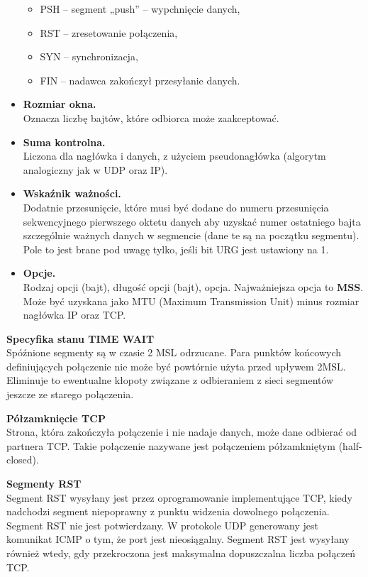 \documentclass[../main.tex]{subfiles}
\begin{document}
\begin{itemize}
\begin{itemize}
            \item PSH – segment „push” – wypchnięcie danych,
            \item RST – zresetowanie połączenia,
            \item SYN – synchronizacja,
            \item FIN – nadawca zakończył przesyłanie danych.
        \end{itemize}
        \item \textbf{Rozmiar okna.}\\
        Oznacza liczbę bajtów, które odbiorca może zaakceptować.
        \item \textbf{Suma kontrolna.}\\
        Liczona dla nagłówka i danych, z użyciem pseudonagłówka (algorytm
        analogiczny jak w UDP oraz IP).
        \item \textbf{Wskaźnik ważności.}\\
        Dodatnie przesunięcie, które musi być dodane do numeru przesunięcia
        sekwencyjnego pierwszego oktetu danych aby uzyskać numer ostatniego bajta szczególnie
        ważnych danych w segmencie (dane te są na początku segmentu). Pole to jest brane pod
        uwagę tylko, jeśli bit URG jest ustawiony na 1.
        \item \textbf{Opcje.}\\
        Rodzaj opcji (bajt), długość opcji (bajt), opcja. Najważniejsza opcja to \textbf{MSS}. Może być uzyskana jako MTU (Maximum Transmission Unit) minus rozmiar nagłówka IP oraz TCP.
    \end{itemize}

    \textbf{Specyfika stanu TIME WAIT}\\
    Spóźnione segmenty są w czasie 2 MSL odrzucane. Para
    punktów końcowych definiujących połączenie nie może być powtórnie użyta przed upływem
    2MSL. Eliminuje to ewentualne kłopoty związane z odbieraniem z sieci segmentów jeszcze ze
    starego połączenia.

    \textbf{Półzamknięcie TCP}\\
    Strona, która zakończyła połączenie i nie nadaje danych, może dane odbierać od partnera
    TCP. Takie połączenie nazywane jest połączeniem półzamkniętym (half-closed).

    \textbf{Segmenty RST}\\
    Segment RST wysyłany jest przez oprogramowanie implementujące TCP, kiedy nadchodzi
    segment niepoprawny z punktu widzenia dowolnego połączenia. Segment RST nie jest potwierdzany. W protokole UDP generowany jest komunikat ICMP o tym, że port jest nieosiągalny.
    Segment RST jest wysyłany również wtedy, gdy przekroczona jest maksymalna dopuszczalna
    liczba połączeń TCP.
\end{document}

